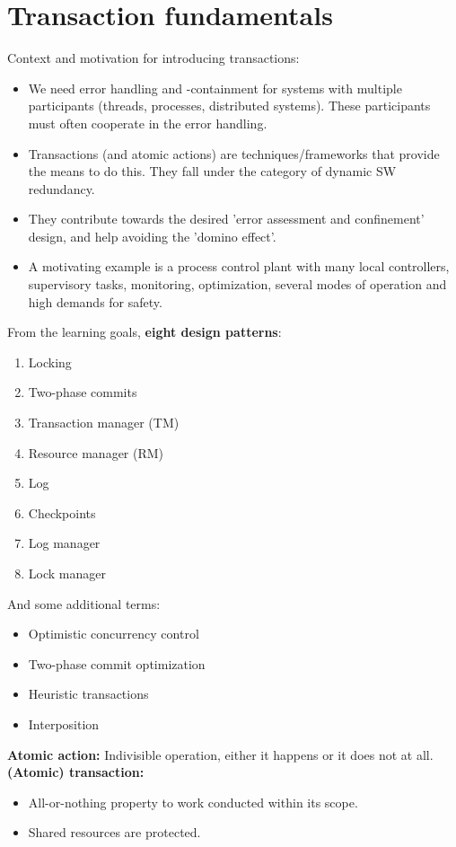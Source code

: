 \part{Transaction fundamentals}
Context and motivation for introducing transactions:
\begin{itemize}
    \item We need error handling and -containment for systems with multiple participants (threads, processes, distributed systems). These participants must often cooperate in the error handling.
    \item Transactions (and atomic actions) are techniques/frameworks that provide the means to do this. They fall under the category of dynamic SW redundancy.
    \item They contribute towards the desired 'error assessment and confinement' design, and help avoiding the 'domino effect'.
    \item A motivating example is a process control plant with many local controllers, supervisory tasks, monitoring, optimization, several modes of operation and high demands for safety.
\end{itemize}
From the learning goals, \textbf{eight design patterns}:
\begin{enumerate}
    \item Locking
    \item Two-phase commits
    \item Transaction manager (TM)
    \item Resource manager (RM)
    \item Log 
    \item Checkpoints
    \item Log manager
    \item Lock manager
\end{enumerate}
And some additional terms:
\begin{itemize}
    \item Optimistic concurrency control
    \item Two-phase commit optimization
    \item Heuristic transactions
    \item Interposition
\end{itemize}
\textbf{Atomic action:} Indivisible operation, either it happens or it does not at all.\newpage
\textbf{(Atomic) transaction:} 
\begin{itemize}
    \item All-or-nothing property to work conducted within its scope.
    \item Shared resources are protected.
\end{itemize}

